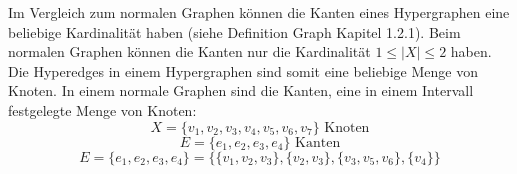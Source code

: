 Im Vergleich zum normalen Graphen können die Kanten eines Hypergraphen eine beliebige Kardinalität haben (siehe Definition Graph Kapitel 1.2.1).
Beim normalen Graphen können die Kanten nur die Kardinalität $1 \leq |X| \leq 2$ haben.
Die Hyperedges in einem Hypergraphen sind somit eine beliebige Menge von Knoten.
In einem normale Graphen sind die Kanten, eine in einem Intervall festgelegte Menge von Knoten:
    \[X = \{v_{1}, v_{2}, v_{3}, v_{4}, v_{5}, v_{6}, v_{7}\} \text{ Knoten}\]
    \[E=\{e_{1}, e_{2}, e_{3}, e_{4}\} \text{ Kanten}\]
    \[E=\{e_{1}, e_{2}, e_{3}, e_{4}\} = \{\{v_{1}, v_{2}, v_{3}\}, \{v_{2}, v_{3}\}, \{v_{3}, v_{5}, v_{6}\}, \{v_{4}\}\} \]

